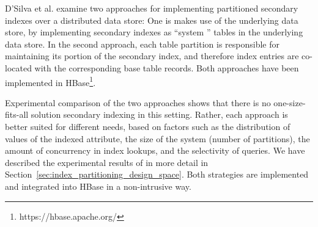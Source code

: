 \bigskip
\noindent
D'Silva et al. \cite{dsilva:tworings} examine two approaches for implementing partitioned secondary indexes over a
distributed data store:
One is makes use of the underlying data store, by implementing secondary indexes as ``system '' tables in the underlying
data store.
In the second approach, each table partition is responsible for maintaining its portion of the secondary index,
and therefore index entries are co-located with the corresponding base table records.
Both approaches have been implemented in HBase\footnote{https://hbase.apache.org/}.

Experimental comparison of the two approaches shows that there is no one-size-fits-all solution secondary indexing in
this setting.
Rather, each approach is better suited for different needs,
based on factors such as the distribution of values of the indexed attribute,
the size of the system (number of partitions), the amount of concurrency in index lookups,
and the selectivity of queries.
We have described the experimental results of \cite{dsilva:tworings} in more detail in Section~\ref{sec:index_partitioning_design_space}.
Both strategies are implemented and integrated into HBase in a non-intrusive way.


